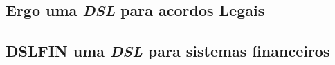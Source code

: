






\newpage
\subsection{Ergo uma \textit{DSL} para acordos Legais}
\label{ergo}


\subsection{DSLFIN uma \textit{DSL} para sistemas financeiros}
\label{dslfin}